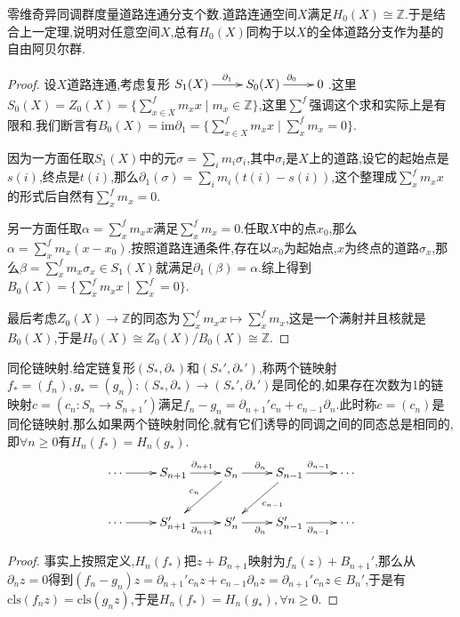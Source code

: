 零维奇异同调群度量道路连通分支个数.道路连通空间$X$满足$H_0(X)\cong\mathbb{Z}$.于是结合上一定理,说明对任意空间$X$,总有$H_0(X)$同构于以$X$的全体道路分支作为基的自由阿贝尔群.
\begin{proof}
	
	设$X$道路连通,考虑复形$\xymatrix{S_1(X)\ar[r]^{\partial_1}&S_0(X)\ar[r]^{\partial_0}&0}$.这里$S_0(X)=Z_0(X)=\{\sum_{x\in X}^fm_xx\mid m_x\in\mathbb{Z}\}$,这里$\sum^f$强调这个求和实际上是有限和.我们断言有$B_0(X)=\mathrm{im}\partial_1=\{\sum^f_{x\in X}m_xx\mid\sum_x^fm_x=0\}$.
	
	因为一方面任取$S_1(X)$中的元$\sigma=\sum_im_i\sigma_i$,其中$\sigma_i$是$X$上的道路,设它的起始点是$s(i)$,终点是$t(i)$,那么$\partial_1(\sigma)=\sum_im_i(t(i)-s(i))$,这个整理成$\sum_x^fm_xx$的形式后自然有$\sum_x^fm_x=0$.
	
	另一方面任取$\alpha=\sum_x^fm_xx$满足$\sum_x^fm_x=0$.任取$X$中的点$x_0$,那么$\alpha=\sum_x^fm_x(x-x_0)$.按照道路连通条件,存在以$x_0$为起始点,$x$为终点的道路$\sigma_x$,那么$\beta=\sum_x^fm_x\sigma_x\in S_1(X)$就满足$\partial_1(\beta)=\alpha$.综上得到$B_0(X)=\{\sum_x^fm_xx\mid\sum_x^f=0\}$.
	
	最后考虑$Z_0(X)\to\mathbb{Z}$的同态为$\sum_x^fm_xx\mapsto\sum_x^fm_x$,这是一个满射并且核就是$B_0(X)$,于是$H_0(X)\cong Z_0(X)/B_0(X)\cong\mathbb{Z}$.
\end{proof}

同伦链映射.给定链复形$(S_*,\partial_*)$和$(S_*',\partial_*')$,称两个链映射$f_*=(f_n),g_*=(g_n):(S_*,\partial_*)\to(S_*',\partial_*')$是同伦的,如果存在次数为1的链映射$c=(c_n:S_n\to S_{n+1}')$满足$f_n-g_n=\partial_{n+1}'c_n+c_{n-1}\partial_n$.此时称$c=(c_n)$是同伦链映射.那么如果两个链映射同伦,就有它们诱导的同调之间的同态总是相同的,即$\forall n\ge0$有$H_n(f_*)=H_n(g_*)$.
$$\xymatrix{\cdots\ar[r]&S_{n+1}\ar[r]^{\partial_{n+1}}&S_n\ar[r]^{\partial_n}\ar[dl]_{c_n}&S_{n-1}\ar[r]^{\partial_{n-1}}\ar[dl]^{c_{n-1}}&\cdots\\\cdots\ar[r]&S_{n+1}'\ar[r]_{\partial_{n+1}}&S_n'\ar[r]_{\partial_n}&S_{n-1}'\ar[r]_{\partial_{n-1}}&\cdots}$$
\begin{proof}
	
	事实上按照定义,$H_n(f_*)$把$z+B_{n+1}$映射为$f_n(z)+B_{n+1}'$,那么从$\partial_nz=0$得到$(f_n-g_n)z=\partial_{n+1}'c_nz+c_{n-1}\partial_nz=\partial_{n+1}'c_nz\in B_n'$,于是有$\mathrm{cls}(f_nz)=\mathrm{cls}(g_nz)$,于是$H_n(f_*)=H_n(g_*),\forall n\ge0$.
\end{proof}

